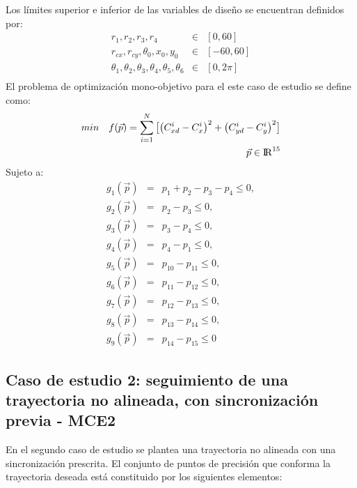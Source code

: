 Los límites superior e inferior de las variables de diseño se encuentran definidos
por:
\begin{eqnarray}\label{eq:limites variables MEC1}
r_1,r_2,r_3,r_4& \in & \left[ 0,60\right] \\
r_{cx},r_{cy},\theta_0,x_0,y_0 & \in & \left[ -60,60\right] \\
\theta_1,\theta_2,\theta_3,\theta_4,\theta_5,\theta_6& \in & \left[ 0,2\pi \right] \\
\end{eqnarray}
El problema de optimización mono-objetivo para el este caso de estudio se define como:
 \begin{equation}\label{}
 \begin{aligned}
min\quad  f(\vec{p})=
\sum_{i=1}^{N}\big[\big(C^{i}_{xd}-C^{i}_{x} \big)^2 +\big(C^{i}_{yd}-C^{i}_{y} \big)^2\big]
\\
\vec{p} \in  {\rm I\!R}^{15}
\\
\end{aligned}
\end{equation}
Sujeto a:
\begin{eqnarray}\label{eq:Restricciones MEC1}
g_{1}(\vec{p})&=&p_{1}+ p_{2}-p_{3}-p_{4} \leq 0,\\
g_{2}(\vec{p})&=&p_{2}-p_{3} \leq 0,\\
g_{3}(\vec{p})&=&p_{3}-p_{4} \leq 0,\\
g_{4}(\vec{p})&=&p_{4}-p_{1} \leq 0,\\
g_{5}(\vec{p})&=&p_{10}-p_{11} \leq 0,\\
g_{6}(\vec{p})&=&p_{11}-p_{12} \leq 0,\\
g_{7}(\vec{p})&=&p_{12}-p_{13} \leq 0,\\
g_{8}(\vec{p})&=&p_{13}-p_{14} \leq 0,\\
g_{9}(\vec{p})&=&p_{14}-p_{15} \leq 0
\end{eqnarray}


\subsection{Caso de estudio 2: seguimiento de una trayectoria no alineada, con
sincronización previa - MCE2}
En el segundo caso de estudio se plantea una trayectoria no alineada con una sincronización  prescrita. El conjunto de puntos de precisión que conforma la trayectoria deseada está constituido por los siguientes elementos: 

